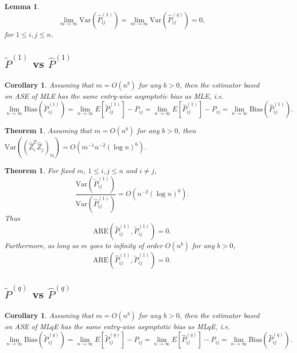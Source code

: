 \documentclass[a4paper]{article}
\newtheorem{lemma}[fact]{Lemma}
\newtheorem{theorem}[fact]{Theorem}
\newtheorem{corollary}[fact]{Corollary}
\renewcommand{\hat}{\widehat}
\begin{document}
\begin{lemma}
\[
	\lim_{m \to \infty} \mathrm{Var}(\hat{P}^{(1)}_{ij})
    = \lim_{m \to \infty} \mathrm{Var}(\hat{P}^{(q)}_{ij}) = 0,
\]
for $1 \le i, j \le n$.
\end{lemma}


\subsection{$\widetilde{P}^{(1)}$ vs $\hat{P}^{(1)}$}
\begin{corollary}
\label{cor:L1Consistent}
Assuming that $m = O(n^b)$ for any $b > 0$, then the estimator based on ASE of MLE has the same entry-wise asymptotic bias as MLE, i.e.
\[
	\lim_{n \to \infty} \mathrm{Bias}(\widetilde{P}_{ij}^{(1)}) = \lim_{n \to \infty} E[\widetilde{P}_{ij}^{(1)}] - P_{ij} = \lim_{n \to \infty} E[\hat{P}^{(1)}_{ij}] - P_{ij}
    = \lim_{n \to \infty} \mathrm{Bias}(\hat{P}_{ij}^{(1)}).
\]
\end{corollary}

\begin{theorem}
\label{thm:VarASEL1}
Assuming that $m = O(n^b)$ for any $b > 0$, then $\mathrm{Var}((\hat{Z}_i^T \hat{Z}_j)_{\mathrm{tr}}) = O(m^{-1} n^{-2} (\log n)^6)$.
\end{theorem}

\begin{theorem}
\label{thm:AREL1}
For fixed $m$, $1 \le i, j \le n$ and $i \ne j$,
\[
	\frac{\mathrm{Var}(\widetilde{P}_{ij}^{(1)})}{\mathrm{Var}(\hat{P}_{ij}^{(1)})}
    = O(n^{-2} (\log n)^6).
\]
Thus
\[
	\mathrm{ARE}(\hat{P}_{ij}^{(1)}, \widetilde{P}_{ij}^{(1)}) = 0.
\]
Furthermore, as long as $m$ goes to infinity of order $O(n^b)$ for any $b > 0$,
\[
	\mathrm{ARE}(\hat{P}_{ij}^{(1)}, \widetilde{P}_{ij}^{(1)}) = 0.
\]
\end{theorem}





\subsection{$\widetilde{P}^{(q)}$ vs $\hat{P}^{(q)}$}
\begin{corollary}
\label{cor:LqConsistent}
Assuming that $m = O(n^b)$ for any $b > 0$, then the estimator based on ASE of ML$q$E has the same entry-wise asymptotic bias as ML$q$E, i.e.
\[
	\lim_{n \to \infty} \mathrm{Bias}(\widetilde{P}_{ij}^{(q)}) = \lim_{n \to \infty} E[\widetilde{P}_{ij}^{(q)}] - P_{ij} = \lim_{n \to \infty} E[\hat{P}^{(q)}_{ij}] - P_{ij}
    = \lim_{n \to \infty} \mathrm{Bias}(\hat{P}_{ij}^{(q)}).
\]
\end{corollary}
\end{document}
